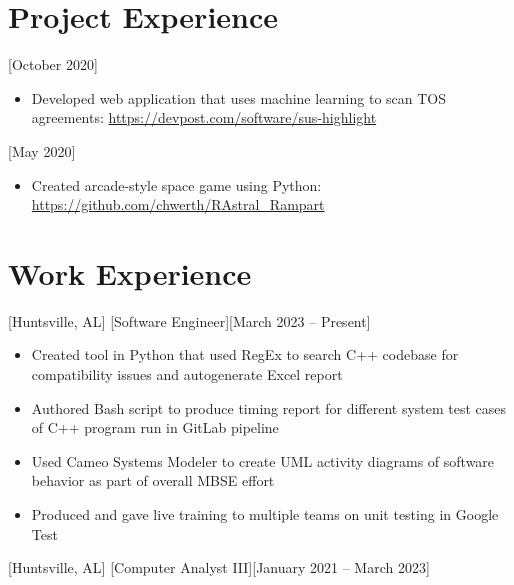 \documentclass[hidelinks, 11pt]{article}
\newcommand{\link}[1]{{\color{blue}\href{#1}{#1}}}
\begin{document}
\section{Project Experience}

[October 2020]

\begin{itemize}
  \item Developed web application that uses machine learning to scan TOS agreements: \link{https://devpost.com/software/sus-highlight}
\end{itemize}

[May 2020]

\begin{itemize}
  \item Created arcade-style space game using Python: \link{https://github.com/chwerth/RAstral\_Rampart}
\end{itemize}

\section{Work Experience}

[Huntsville, AL]
[Software Engineer][March 2023 -- Present]

\begin{itemize}
  \item Created tool in Python that used RegEx to search C++ codebase for compatibility issues and autogenerate Excel report
  \item Authored Bash script to produce timing report for different system test cases of C++ program run in GitLab pipeline
  \item Used Cameo Systems Modeler to create UML activity diagrams of software behavior as part of overall MBSE effort
  \item Produced and gave live training to multiple teams on unit testing in Google Test
\end{itemize}

[Huntsville, AL]
[Computer Analyst III][January 2021 -- March 2023]
\end{document}
